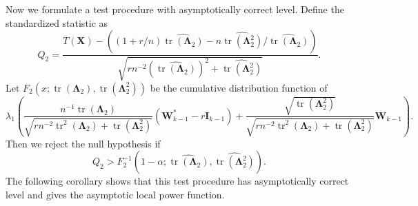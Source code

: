 \documentclass[12pt]{article} %
\DeclareMathOperator{\mytr}{tr}
\newcommand{\bX}{\mathbf{X}}
\newcommand{\bI}{\mathbf{I}}
\newcommand{\bW}{\mathbf{W}}
\newcommand{\bfsym}[1]{\ensuremath{\boldsymbol{#1}}}
\def\bLambda {\bfsym {\Lambda}}
\theoremstyle{definition}
\begin{document}
Now we formulate a test procedure with asymptotically correct level.
Define the standardized statistic as
\begin{equation*}
    Q_2=
\frac{
    T(\bX)
    -
    \left((1+r/n)\widehat{\mytr(\bLambda_2)}-n\widehat{\mytr(\bLambda_2^2)}/\widehat{\mytr(\bLambda_2)}\right)
}{
    \sqrt{
        rn^{-2}(\widehat{\mytr(\bLambda_2)})^2+ 
        \widehat{\mytr(\bLambda_2^2)}
    }
}.
\end{equation*}
Let $
F_2(x;\mytr(\bLambda_2),\mytr(\bLambda_2^2))
$ be the cumulative distribution function of
\begin{equation*}
\lambda_1
\left(
\frac{
    n^{-1} \mytr(\bLambda_2)
}{
    \sqrt{
        rn^{-2} \mytr^2 (\bLambda_2) + \mytr(\bLambda_2^2)
    }
}
(\bW_{k-1}^* - r\bI_{k-1})
+
\frac{
    \sqrt{\mytr(\bLambda_2^2)}
}{
    \sqrt{
        rn^{-2} \mytr^2 (\bLambda_2) + \mytr(\bLambda_2^2)
    }
}
\bW_{k-1}
\right).
\end{equation*}
Then we reject the null hypothesis if
\begin{equation*}
    Q_2
    >
    F_2^{-1}\left(1-\alpha;\widehat{\mytr(\bLambda_2)},\widehat{\mytr(\bLambda_2^2)}\right).
\end{equation*}
The following corollary shows that this test procedure has asymptotically correct level and gives the asymptotic local power function.
\end{document}
